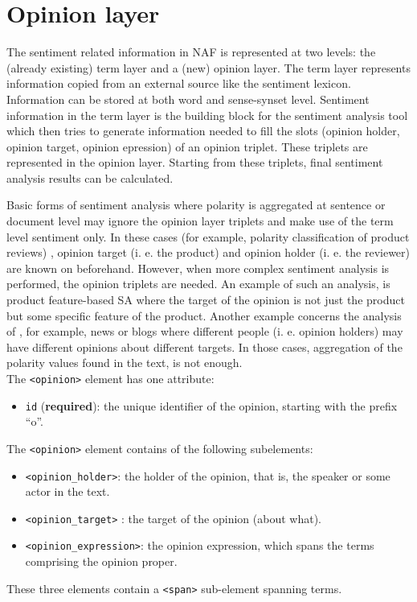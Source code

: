 
\section{Opinion layer}
\label{sec:opinion-layer}

The sentiment related information in NAF is represented at two levels: the
(already existing) term layer and a (new) opinion layer. The term layer
represents information copied from an external source like the sentiment
lexicon. Information can be stored at both word and sense-synset
level. Sentiment information in the term layer is the building block for the
sentiment analysis tool which then tries to generate information needed to
fill the slots (opinion holder, opinion target, opinion epression) of an
opinion triplet. These triplets are represented in the opinion
layer. Starting from these triplets, final sentiment analysis results can be
calculated.

Basic forms of sentiment analysis where polarity is aggregated at sentence
or document level may ignore the opinion layer triplets and make use of the
term level sentiment only. In these cases (for example, polarity
classification of product reviews) , opinion target (i. e. the product) and
opinion holder (i. e. the reviewer) are known on beforehand. However, when
more complex sentiment analysis is performed, the opinion triplets are
needed. An example of such an analysis, is product feature-based SA where
the target of the opinion is not just the product but some specific feature
of the product. Another example concerns the analysis of , for example, news
or blogs where different people (i. e. opinion holders) may have different
opinions about different targets. In those cases, aggregation of the
polarity values found in the text, is not enough.\\


The \texttt{<opinion>} element has one attribute:
\begin{itemize}
\item \texttt{id} (\textbf{required}): the unique identifier of the opinion,
  starting with the prefix ``o''.
\end{itemize}

The \texttt{<opinion>} element contains of the following subelements:
\begin{itemize}
\item \texttt{<opinion\_holder>}: the holder of the opinion, that is, the
  speaker or some actor in the text.
\item \texttt{<opinion\_target>} :  the target of the opinion (about what).
\item \texttt{<opinion\_expression>}: the opinion expression, which spans the
  terms comprising the opinion proper.
\end{itemize}
These three elements contain a \texttt{<span>} sub-element spanning terms.\\

